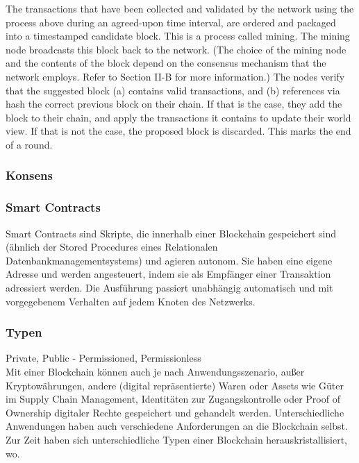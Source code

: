     The transactions that have been collected and validated by the network using the process above during an agreed-upon time interval, are ordered and packaged into a timestamped candidate block. This is a process called mining. The mining node broadcasts this block back to the network. (The choice of the mining node and the contents of the block depend on the consensus mechanism that the network employs. Refer to Section II-B for more information.)
    The nodes verify that the suggested block (a) contains valid transactions, and (b) references via hash the correct previous block on their chain. If that is the case, they add the block to their chain, and apply the transactions it contains to update their world view. If that is not the case, the proposed block is discarded. This marks the end of a round.\cite{Christidis2016}
	    
    \subsubsection{Konsens}
    \label{sec:sota_blockchain_consensus}
    
    \subsubsection{Smart Contracts}
    \label{sec:sota_blockchain_sc}
        Smart Contracts sind Skripte, die innerhalb einer Blockchain gespeichert sind (ähnlich der Stored Procedures eines Relationalen Datenbankmanagementsystems) und agieren autonom. 
        Sie haben eine eigene Adresse und werden angesteuert, indem sie als Empfänger einer Transaktion adressiert werden.
        Die Ausführung passiert unabhängig automatisch und mit vorgegebenem Verhalten auf jedem Knoten des Netzwerks.
        \cite{Christidis2016} 
    
    \subsubsection{Typen}
    \label{sec:sota_blockchain_types}
        Private, Public - Permissioned, Permissionless
        \medskip\\
        Mit einer Blockchain können auch je nach Anwendungsszenario, außer Kryptowährungen, andere (digital repräsentierte) Waren oder Assets wie Güter im Supply Chain Management\cite{Underwood2016}, Identitäten zur Zugangskontrolle\cite{Kshetri2017} oder Proof of Ownership digitaler Rechte\cite{Wuest2017} gespeichert und gehandelt werden. 
        Unterschiedliche Anwendungen haben auch verschiedene Anforderungen an die Blockchain selbst. 
        Zur Zeit haben sich unterschiedliche Typen einer Blockchain herauskristallisiert, wo.
        
